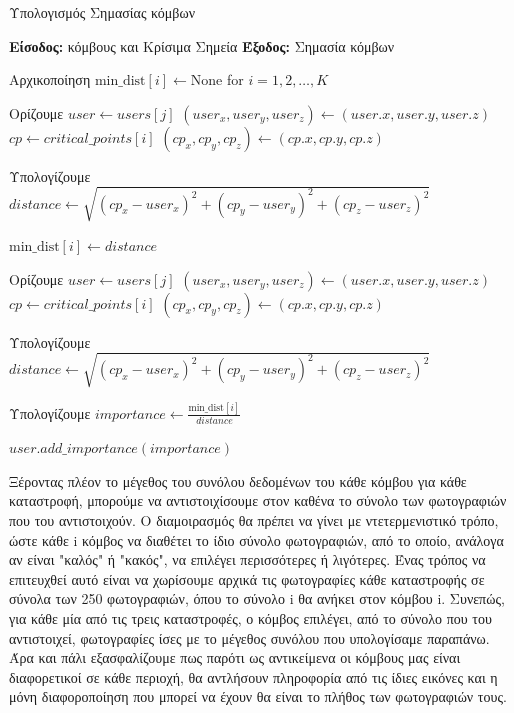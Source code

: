 \begin{algorithm}[H]
    \caption{Υπολογισμός Σημασίας κόμβων} \label{algorithm3}
    \begin{algorithmic}[1]
    \STATE \textbf{Είσοδος:} κόμβους και Κρίσιμα Σημεία
    \STATE \textbf{Έξοδος:} Σημασία κόμβων

        \STATE Αρχικοποίηση $\text{min\_dist}[i] \gets \text{None}$ for $i = 1, 2, \dots, K$

                \STATE Ορίζουμε $user \gets users[j]$
                \STATE $(user_x, user_y, user_z) \gets (user.x, user.y, user.z)$
                \STATE $cp \gets critical\_points[i]$
                \STATE $(cp_x, cp_y, cp_z) \gets (cp.x, cp.y, cp.z)$
                
                \STATE Υπολογίζουμε $distance \gets \sqrt{(cp_x - user_x)^2 + (cp_y - user_y)^2 + (cp_z - user_z)^2}$
                
                    \STATE $\text{min\_dist}[i] \gets distance$
                \ENDIF
            \ENDFOR
    
                \STATE Ορίζουμε $user \gets users[j]$
                \STATE $(user_x, user_y, user_z) \gets (user.x, user.y, user.z)$
                \STATE $cp \gets critical\_points[i]$
                \STATE $(cp_x, cp_y, cp_z) \gets (cp.x, cp.y, cp.z)$
                
                \STATE Υπολογίζουμε $distance \gets \sqrt{(cp_x - user_x)^2 + (cp_y - user_y)^2 + (cp_z - user_z)^2}$
                
                \STATE Υπολογίζουμε $importance \gets \frac{\text{min\_dist}[i]}{distance}$
                
                \STATE $user.add\_importance(importance)$
            \ENDFOR
        \ENDFOR
    \ENDFOR
    \end{algorithmic}
\end{algorithm}
\vspace{-7pt}
    
Ξέροντας πλέον το μέγεθος του συνόλου δεδομένων του κάθε κόμβου για κάθε καταστροφή, μπορούμε να αντιστοιχίσουμε στον καθένα το σύνολο των φωτογραφιών που του αντιστοιχούν. Ο διαμοιρασμός θα πρέπει να γίνει με ντετερμενιστικό τρόπο, ώστε κάθε i κόμβος να διαθέτει το ίδιο σύνολο φωτογραφιών, από το οποίο, ανάλογα αν είναι "καλός" ή "κακός", να επιλέγει περισσότερες ή λιγότερες. Ένας τρόπος να επιτευχθεί αυτό είναι να χωρίσουμε αρχικά τις φωτογραφίες κάθε καταστροφής σε σύνολα των 250 φωτογραφιών, όπου το σύνολο i θα ανήκει στον κόμβου i. Συνεπώς, για κάθε μία από τις τρεις καταστροφές, ο κόμβος επιλέγει, από το σύνολο που του αντιστοιχεί, φωτογραφίες ίσες με το μέγεθος συνόλου που υπολογίσαμε παραπάνω. Άρα και πάλι εξασφαλίζουμε πως παρότι ως αντικείμενα οι κόμβους μας είναι διαφορετικοί σε κάθε περιοχή, θα αντλήσουν πληροφορία από τις ίδιες εικόνες και η μόνη διαφοροποίηση που μπορεί να έχουν θα είναι το πλήθος των φωτογραφιών τους.

